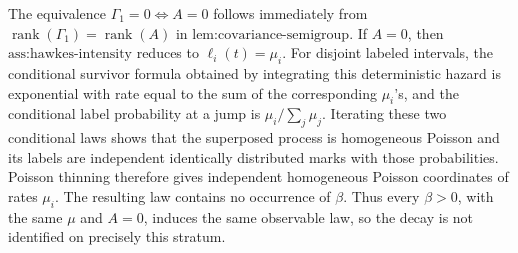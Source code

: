 The equivalence \(\Gamma_1=0\Longleftrightarrow A=0\) follows immediately from \(\operatorname{rank}(\Gamma_1)=\operatorname{rank}(A)\) in \(\text{lem:covariance-semigroup}\).  If \(A=0\), then \(\text{ass:hawkes-intensity}\) reduces to \(\ell_i(t)=\mu_i\).  For disjoint labeled intervals, the conditional survivor formula obtained by integrating this deterministic hazard is exponential with rate equal to the sum of the corresponding \(\mu_i\)'s, and the conditional label probability at a jump is \(\mu_i/\sum_j\mu_j\).  Iterating these two conditional laws shows that the superposed process is homogeneous Poisson and its labels are independent identically distributed marks with those probabilities.  Poisson thinning therefore gives independent homogeneous Poisson coordinates of rates \(\mu_i\).  The resulting law contains no occurrence of \(\beta\).  Thus every \(\beta>0\), with the same \(\mu\) and \(A=0\), induces the same observable law, so the decay is not identified on precisely this stratum.